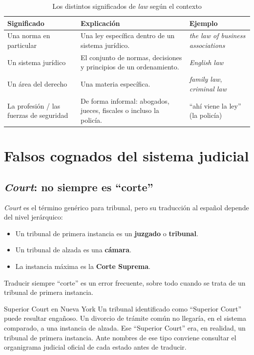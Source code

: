\documentclass[12pt,oneside]{book}
\begin{document}
\begin{table}[H]
\centering
\caption{Los distintos significados de \textit{law} según el contexto}
\begin{tabularx}{\textwidth}{>{\raggedright\arraybackslash}p{} >{\raggedright\arraybackslash}X >{\raggedright\arraybackslash}p{}}
\toprule
\textbf{Significado} & \textbf{Explicación} & \textbf{Ejemplo} \\
\midrule
Una norma en particular & Una ley específica dentro de un sistema jurídico. & \textit{the law of business associations} \\
Un sistema jurídico & El conjunto de normas, decisiones y principios de un ordenamiento. & \textit{English law} \\
Un área del derecho & Una materia específica. & \textit{family law}, \textit{criminal law} \\
La profesión / las fuerzas de seguridad & De forma informal: abogados, jueces, fiscales o incluso la policía. & ``ahí viene la ley'' (la policía) \\
\bottomrule
\end{tabularx}
\end{table}

\section{Falsos cognados del sistema judicial}
\label{sec:court}

\subsection{\textit{Court}: no siempre es ``corte''}

\textit{Court} es el término genérico para tribunal, pero su traducción al español depende del nivel jerárquico:

\begin{itemize}
    \item Un tribunal de primera instancia es un \textbf{juzgado} o \textbf{tribunal}.
    \item Un tribunal de alzada es una \textbf{cámara}.
    \item La instancia máxima es la \textbf{Corte Suprema}.
\end{itemize}

Traducir siempre ``corte'' es un error frecuente, sobre todo cuando se trata de un tribunal de primera instancia.

\begin{example}{Superior Court en Nueva York}
Un tribunal identificado como ``Superior Court'' puede resultar engañoso. Un divorcio de trámite común no llegaría, en el sistema comparado, a una instancia de alzada. Ese ``Superior Court'' era, en realidad, un tribunal de primera instancia. Ante nombres de ese tipo conviene consultar el organigrama judicial oficial de cada estado antes de traducir.
\end{example}
\end{document}
